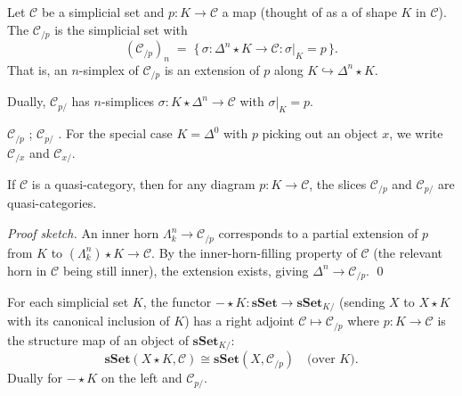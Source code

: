 \begin{definition}
\label{def:slice-over}
Let $\mathcal{C}$ be a simplicial set and $p : K \to \mathcal{C}$ a map
(thought of as a  of shape $K$ in $\mathcal{C}$). The
 $\mathcal{C}_{/p}$ is the simplicial set with
\begin{equation*}
  (\mathcal{C}_{/p})_n \;=\; \{\,\sigma : \Delta^n \star K \to \mathcal{C} : \sigma|_K = p\,\}.
\end{equation*}
That is, an $n$-simplex of $\mathcal{C}_{/p}$ is an extension of $p$
along $K \hookrightarrow \Delta^n \star K$.
\end{definition}

\begin{definition}
\label{def:slice-under}
Dually, $\mathcal{C}_{p/}$ has $n$-simplices $\sigma : K \star \Delta^n \to
\mathcal{C}$ with $\sigma|_K = p$.
\end{definition}

\begin{howtosay}
$\mathcal{C}_{/p}$ ; $\mathcal{C}_{p/}$
. For the special case $K = \Delta^0$
with $p$ picking out an object $x$, we write $\mathcal{C}_{/x}$ and
$\mathcal{C}_{x/}$.
\end{howtosay}

\begin{theorem}
\label{thm:slice-is-qcat}
If $\mathcal{C}$ is a quasi-category, then for any diagram $p : K \to
\mathcal{C}$, the slices $\mathcal{C}_{/p}$ and $\mathcal{C}_{p/}$ are
quasi-categories.
\end{theorem}

\begin{proof}[Proof sketch]
An inner horn $\Lambda^n_k \to \mathcal{C}_{/p}$ corresponds to a partial
extension of $p$ from $K$ to $(\Lambda^n_k) \star K \to \mathcal{C}$.
By the inner-horn-filling property of $\mathcal{C}$ (the relevant horn
in $\mathcal{C}$ being still inner), the extension exists, giving
$\Delta^n \to \mathcal{C}_{/p}$. \qed
\end{proof}

\begin{theorem}
\label{thm:join-slice-adj}
For each simplicial set $K$, the functor $- \star K : \mathbf{sSet} \to
\mathbf{sSet}_{K/}$ (sending $X$ to $X \star K$ with its canonical
inclusion of $K$) has a right adjoint $\mathcal{C} \mapsto \mathcal{C}_{/p}$
where $p : K \to \mathcal{C}$ is the structure map of an object of
$\mathbf{sSet}_{K/}$:
\begin{equation*}
  \mathbf{sSet}(X \star K, \mathcal{C}) \cong \mathbf{sSet}(X, \mathcal{C}_{/p}) \quad
  \text{(over } K \text{)}.
\end{equation*}
Dually for $- \star K$ on the left and $\mathcal{C}_{p/}$.
\end{theorem}


